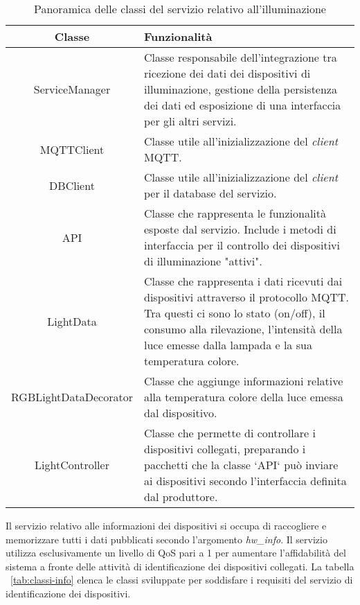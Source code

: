 \begin{table}[!h]
\caption{Panoramica delle classi del servizio relativo all'illuminazione}
\label{tab:classi-illuminazione}
\begin{tabularx}{\linewidth}{|c|X|}
\hline
\textbf{Classe} & \textbf{Funzionalità} \\
\hline
ServiceManager & Classe responsabile dell'integrazione tra ricezione dei dati dei dispositivi di illuminazione, gestione della persistenza dei dati ed esposizione di una interfaccia per gli altri servizi. \\
\hline
MQTTClient & Classe utile all'inizializzazione del \emph{client} MQTT. \\
\hline
DBClient & Classe utile all'inizializzazione del \emph{client} per il database del servizio. \\
\hline
API & Classe che rappresenta le funzionalità esposte dal servizio. Include i metodi di interfaccia per il controllo dei dispositivi di illuminazione "attivi". \\
\hline
LightData & Classe che rappresenta i dati ricevuti dai dispositivi attraverso il protocollo MQTT. Tra questi ci sono lo stato (on/off), il consumo alla rilevazione, l'intensità della luce emesse dalla lampada e la sua temperatura colore. \\
\hline
RGBLightDataDecorator & Classe che aggiunge informazioni relative alla temperatura colore della luce emessa dal dispositivo. \\
\hline
LightController & Classe che permette di controllare i dispositivi collegati, preparando i pacchetti che la classe `API` può inviare ai dispositivi secondo l'interfaccia definita dal produttore. \\
\hline
\end{tabularx}
\end{table}

Il servizio relativo alle informazioni dei dispositivi si occupa di raccogliere e memorizzare tutti i dati pubblicati secondo l'argomento \emph{hw\_info}.
Il servizio utilizza esclusivamente un livello di QoS pari a 1 per aumentare l'affidabilità del sistema a fronte delle attività di identificazione dei dispositivi collegati.
La tabella ~\ref{tab:classi-info} elenca le classi sviluppate per soddisfare i requisiti del servizio di identificazione dei dispositivi.

